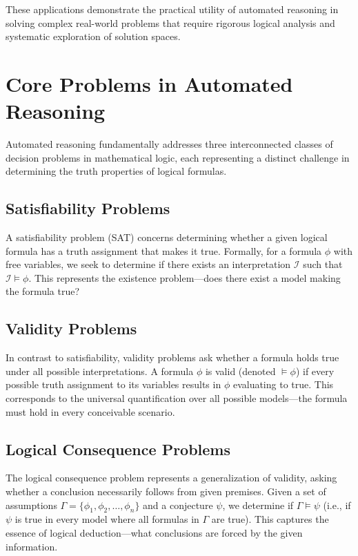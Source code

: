 \documentclass[11pt,a4paper]{article}
\theoremstyle{definition}
\theoremstyle{plain}
\theoremstyle{remark}
\begin{document}
These applications demonstrate the practical utility of automated reasoning in solving complex real-world problems that require rigorous logical analysis and systematic exploration of solution spaces.


\section{Core Problems in Automated Reasoning}

Automated reasoning fundamentally addresses three interconnected classes of decision problems in mathematical logic, each representing a distinct challenge in determining the truth properties of logical formulas.

\subsection{Satisfiability Problems}

A satisfiability problem (SAT) concerns determining whether a given logical formula has a truth assignment that makes it true. Formally, for a formula $\phi$ with free variables, we seek to determine if there exists an interpretation $\mathcal{I}$ such that $\mathcal{I} \models \phi$. This represents the existence problem---does there exist a model making the formula true?

\subsection{Validity Problems}

In contrast to satisfiability, validity problems ask whether a formula holds true under all possible interpretations. A formula $\phi$ is valid (denoted $\models \phi$) if every possible truth assignment to its variables results in $\phi$ evaluating to true. This corresponds to the universal quantification over all possible models---the formula must hold in every conceivable scenario.

\subsection{Logical Consequence Problems}

The logical consequence problem represents a generalization of validity, asking whether a conclusion necessarily follows from given premises. Given a set of assumptions $\Gamma = \{\phi_1, \phi_2, \dots, \phi_n\}$ and a conjecture $\psi$, we determine if $\Gamma \models \psi$ (i.e., if $\psi$ is true in every model where all formulas in $\Gamma$ are true). This captures the essence of logical deduction---what conclusions are forced by the given information.
\end{document}
